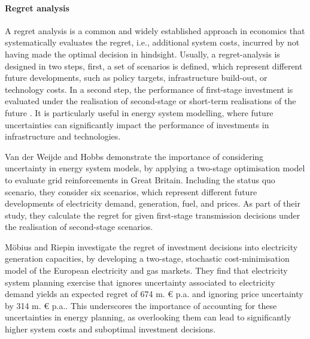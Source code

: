 \documentclass[final,5p,times,twocolumn,sort&compress]{elsarticle}
\begin{document}
\paragraph{Regret analysis}
A regret analysis is a common and widely established approach in economics that systematically evaluates the regret, i.e., additional system costs, incurred by not having made the optimal decision in hindsight. Usually, a regret-analysis is designed in two steps, first, a set of scenarios is defined, which represent different future developments, such as policy targets, infrastructure build-out, or technology costs. In a second step, the performance of first-stage investment is evaluated under the realisation of second-stage or short-term realisations of the future \cite{salvatoreManagerialEconomicPrinciples2008}. It is particularly useful in energy system modelling, where future uncertainties can significantly impact the performance of investments in infrastructure and technologies.

Van der Weijde and Hobbs \cite{vanderweijdeEconomicsPlanningElectricity2012} demonstrate the importance of considering uncertainty in energy system models, by applying a two-stage optimisation model to evaluate grid reinforcements in Great Britain. Including the status quo scenario, they consider six scenarios, which represent different future developments of electricity demand, generation, fuel, and  prices. As part of their study, they calculate the regret for given first-stage transmission decisions under the realisation of second-stage scenarios. 

Möbius and Riepin \cite{mobiusRegretAnalysisInvestment2020} investigate the regret of investment decisions into electricity generation capacities, by developing a two-stage, stochastic cost-minimisation model of the European electricity and gas markets. They find that electricity system planning exercise that ignores uncertainty associated to electricity demand yields an expected regret of 674 m. \euro{} p.a. and ignoring  price uncertainty by 314 m. \euro{} p.a.. This underscores the importance of accounting for these uncertainties in energy planning, as overlooking them can lead to significantly higher system costs and suboptimal investment decisions. 
\end{document}
